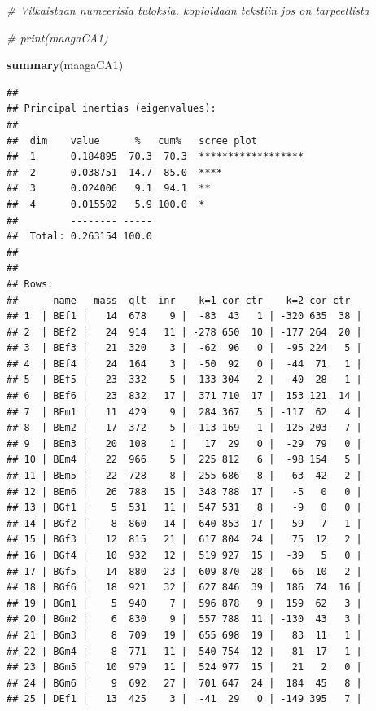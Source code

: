 \documentclass[
  finnish,
]{book}
\newenvironment{Shaded}{\begin{snugshade}}{\end{snugshade}}
\newcommand{\CommentTok}[1]{\textcolor[rgb]{0.56,0.35,0.01}{\textit{#1}}}
\newcommand{\KeywordTok}[1]{\textcolor[rgb]{0.13,0.29,0.53}{\textbf{#1}}}
\newcommand{\NormalTok}[1]{#1}
\begin{document}
\begin{Shaded}
\begin{Highlighting}[]
\CommentTok{# Vilkaistaan numeerisia tuloksia, kopioidaan tekstiin jos on tarpeellista}

\CommentTok{# print(maagaCA1)}

\KeywordTok{summary}\NormalTok{(maagaCA1)}
\end{Highlighting}
\end{Shaded}

\begin{verbatim}
## 
## Principal inertias (eigenvalues):
## 
##  dim    value      %   cum%   scree plot               
##  1      0.184895  70.3  70.3  ******************       
##  2      0.038751  14.7  85.0  ****                     
##  3      0.024006   9.1  94.1  **                       
##  4      0.015502   5.9 100.0  *                        
##         -------- -----                                 
##  Total: 0.263154 100.0                                 
## 
## 
## Rows:
##      name   mass  qlt  inr    k=1 cor ctr    k=2 cor ctr  
## 1  | BEf1 |   14  678    9 |  -83  43   1 | -320 635  38 |
## 2  | BEf2 |   24  914   11 | -278 650  10 | -177 264  20 |
## 3  | BEf3 |   21  320    3 |  -62  96   0 |  -95 224   5 |
## 4  | BEf4 |   24  164    3 |  -50  92   0 |  -44  71   1 |
## 5  | BEf5 |   23  332    5 |  133 304   2 |  -40  28   1 |
## 6  | BEf6 |   23  832   17 |  371 710  17 |  153 121  14 |
## 7  | BEm1 |   11  429    9 |  284 367   5 | -117  62   4 |
## 8  | BEm2 |   17  372    5 | -113 169   1 | -125 203   7 |
## 9  | BEm3 |   20  108    1 |   17  29   0 |  -29  79   0 |
## 10 | BEm4 |   22  966    5 |  225 812   6 |  -98 154   5 |
## 11 | BEm5 |   22  728    8 |  255 686   8 |  -63  42   2 |
## 12 | BEm6 |   26  788   15 |  348 788  17 |   -5   0   0 |
## 13 | BGf1 |    5  531   11 |  547 531   8 |   -9   0   0 |
## 14 | BGf2 |    8  860   14 |  640 853  17 |   59   7   1 |
## 15 | BGf3 |   12  815   21 |  617 804  24 |   75  12   2 |
## 16 | BGf4 |   10  932   12 |  519 927  15 |  -39   5   0 |
## 17 | BGf5 |   14  880   23 |  609 870  28 |   66  10   2 |
## 18 | BGf6 |   18  921   32 |  627 846  39 |  186  74  16 |
## 19 | BGm1 |    5  940    7 |  596 878   9 |  159  62   3 |
## 20 | BGm2 |    6  830    9 |  557 788  11 | -130  43   3 |
## 21 | BGm3 |    8  709   19 |  655 698  19 |   83  11   1 |
## 22 | BGm4 |    8  771   11 |  540 754  12 |  -81  17   1 |
## 23 | BGm5 |   10  979   11 |  524 977  15 |   21   2   0 |
## 24 | BGm6 |    9  692   27 |  701 647  24 |  184  45   8 |
## 25 | DEf1 |   13  425    3 |  -41  29   0 | -149 395   7 |

\end{verbatim}
\end{document}
